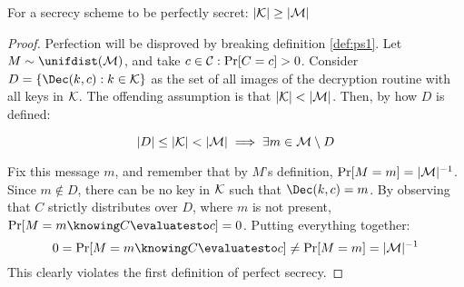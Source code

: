\begin{theorem}
    For a secrecy scheme to be perfectly secret: $|\mathcal{K}| \geq |\mathcal{M}|$
\end{theorem}
\begin{proof}
    Perfection will be disproved by breaking definition \ref{def:ps1}. Let $M \sim \unifdist(\M)$, and take $c \in \mathcal{C} : \Pr[C = c] > 0$. Consider $D = \{\Dec(k, c) : k \in \K\}$ as the set of all images of the decryption routine with all keys in $\mathcal{K}$. The offending assumption is that $|\mathcal{K}| < |\mathcal{M}|$. Then, by how $D$ is defined:

    \[
        |D| \leq |\mathcal{K}| < |\mathcal{M}| \implies \exists m \in \mathcal{M} \setminus D
    \]

    Fix this message $m$, and remember that by $M$'s definition, $\Pr[M = m] = |\mathcal{M}|^{-1}$. Since $m \notin D$, there can be no key in $\mathcal{K}$ such that $\Dec(k, c) = m$. By observing that $C$ strictly distributes over $D$, where $m$ is not present, $\Pr[M = m \knowing C \evaluatesto c] = 0$. Putting everything together:
    \[
        0 = \Pr[M = m \knowing C \evaluatesto c] \neq \Pr[M = m] = |\M|^{-1}
    \]
    This clearly violates the first definition of perfect secrecy.
\end{proof}
